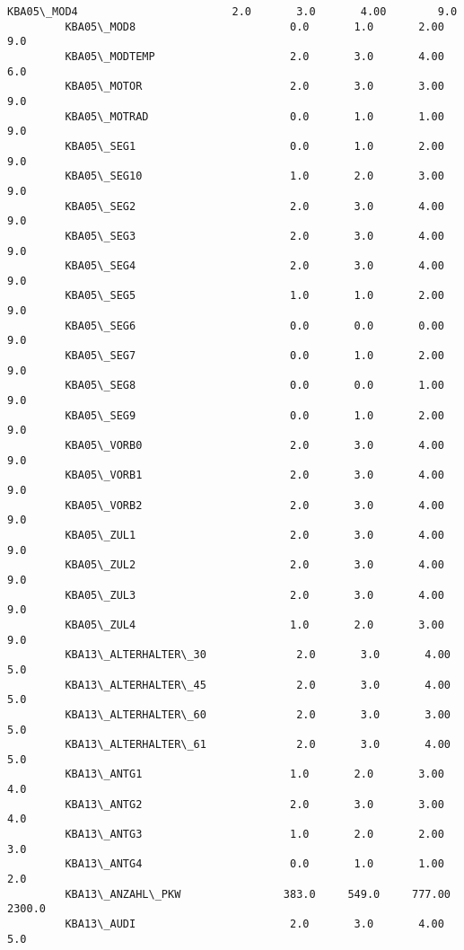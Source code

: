\documentclass[11pt]{article}
\begin{document}
\begin{Verbatim}[commandchars=\\\{\}]
         KBA05\_MOD4                        2.0       3.0       4.00        9.0  
         KBA05\_MOD8                        0.0       1.0       2.00        9.0  
         KBA05\_MODTEMP                     2.0       3.0       4.00        6.0  
         KBA05\_MOTOR                       2.0       3.0       3.00        9.0  
         KBA05\_MOTRAD                      0.0       1.0       1.00        9.0  
         KBA05\_SEG1                        0.0       1.0       2.00        9.0  
         KBA05\_SEG10                       1.0       2.0       3.00        9.0  
         KBA05\_SEG2                        2.0       3.0       4.00        9.0  
         KBA05\_SEG3                        2.0       3.0       4.00        9.0  
         KBA05\_SEG4                        2.0       3.0       4.00        9.0  
         KBA05\_SEG5                        1.0       1.0       2.00        9.0  
         KBA05\_SEG6                        0.0       0.0       0.00        9.0  
         KBA05\_SEG7                        0.0       1.0       2.00        9.0  
         KBA05\_SEG8                        0.0       0.0       1.00        9.0  
         KBA05\_SEG9                        0.0       1.0       2.00        9.0  
         KBA05\_VORB0                       2.0       3.0       4.00        9.0  
         KBA05\_VORB1                       2.0       3.0       4.00        9.0  
         KBA05\_VORB2                       2.0       3.0       4.00        9.0  
         KBA05\_ZUL1                        2.0       3.0       4.00        9.0  
         KBA05\_ZUL2                        2.0       3.0       4.00        9.0  
         KBA05\_ZUL3                        2.0       3.0       4.00        9.0  
         KBA05\_ZUL4                        1.0       2.0       3.00        9.0  
         KBA13\_ALTERHALTER\_30              2.0       3.0       4.00        5.0  
         KBA13\_ALTERHALTER\_45              2.0       3.0       4.00        5.0  
         KBA13\_ALTERHALTER\_60              2.0       3.0       3.00        5.0  
         KBA13\_ALTERHALTER\_61              2.0       3.0       4.00        5.0  
         KBA13\_ANTG1                       1.0       2.0       3.00        4.0  
         KBA13\_ANTG2                       2.0       3.0       3.00        4.0  
         KBA13\_ANTG3                       1.0       2.0       2.00        3.0  
         KBA13\_ANTG4                       0.0       1.0       1.00        2.0  
         KBA13\_ANZAHL\_PKW                383.0     549.0     777.00     2300.0  
         KBA13\_AUDI                        2.0       3.0       4.00        5.0  

\end{Verbatim}
\end{document}
